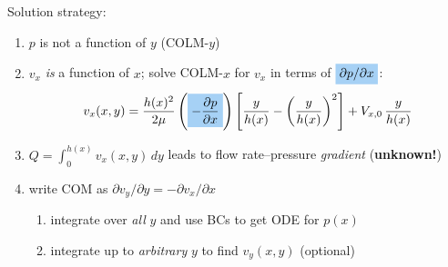 \documentclass[10pt,landscape]{article}
\newcommand{\hlb}[1]{\mbox{\colorbox{onblue}{$\displaystyle #1$}}}
\begin{document}
\begin{minipage}[t]{0.53\textwidth}
    \vspace{-2pt}

    Solution strategy:
    \begin{enumerate}
        \item $p$ is not a function of $y$ (COLM-$y$)
        \item $v_x$ \emph{is} a function of $x$; solve COLM-$x$ for $v_x$ in terms of $\hlb{\partial p/\partial x}$:
        \[
            v_x(x,y) = \frac{h(x)^2}{2\mu}
            \left(\hlb{-\dfrac{\partial p}{\partial x}}\right)
            \left[\frac{y}{h(x)} - \left(\frac{y}{h(x)}\right)^{2}\right]
            + V_{x,0}\,\frac{y}{h(x)}
        \]
        \item $Q = \int_0^{h(x)} v_x(x,y)\,dy$ leads to flow rate--pressure \emph{gradient} (\textbf{unknown!})
        \item write COM as $\partial v_y /\partial y = -\partial v_x/\partial x$
        \begin{enumerate}
            \item integrate over \emph{all} $y$ and use BCs to get ODE for $p(x)$
            \item integrate up to \emph{arbitrary} $y$ to find $v_y(x,y)$ (optional)
        \end{enumerate}
    \end{enumerate}

\end{minipage}
\end{document}
